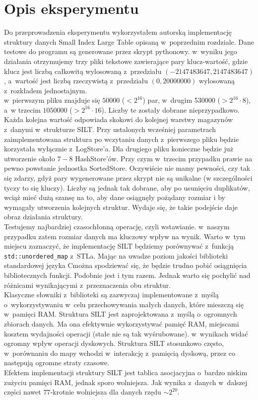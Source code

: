 \documentclass[declaration,shortabstract,masc]{iithesis}
\newcommand{\cpp}{C\raisebox{0.5ex}{{\tiny\textbf{++}}}}
\begin{document}
		\section{Opis eksperymentu}
			Do przeprowadzenia eksperymentu wykorzystałem autorską implementację\linebreak
			struktury danych Small Index Large Table opisaną w~poprzednim rozdziale. Dane testowe do programu są generowane przez skrypt pythonowy. w~wyniku jego działania otrzymujemy trzy pliki tekstowe zawierające pary klucz-wartość, gdzie klucz jest liczbą całkowitą wylosowaną z~przedziału $(-2147483647, 2147483647)$, a~wartość jest liczbą rzeczywistą z~przedziału $(0, 20000000)$ wylosowaną z~rozkładem jednostajnym.\\
			\indent w~pierwszym pliku znajduje się $50000$ ($< 2^{16}$) par, w~drugim 530000 ($> 2^{16}\cdot 8$), a~w trzecim $1050000$ ($> 2^{16}\cdot 16$). Liczby te zostały dobrane nieprzypadkowo. Każda kolejna wartość odpowiada skokowi do kolejnej warstwy magazynów z~danymi w~strukturze SILT. Przy ustalonych wcześniej parametrach zaimplementowana struktura po wczytaniu danych z~pierwszego pliku będzie korzystała wyłącznie z~LogStore'a. Dla drugiego pliku konieczne będzie już utworzenie około $7-8$ HashStore'ów. Przy czym w~trzecim przypadku prawie na pewno powstanie jednostka SortedStore. Oczywiście nie mamy pewności, czy tak się zdarzy, gdyż pary wygenerowane przez skrypt nie są unikalne (w szczególności tyczy to się kluczy). Liczby są jednak tak dobrane, aby po usunięciu duplikatów, wciąż mieć dużą szansę na to, aby dane osiągnęły pożądany rozmiar i by wymagały utworzenia kolejnych struktur. Wydaje się, że takie podejście daje obraz działania struktury.\\
			\indent Testujemy najbardziej czasochłonną operację, czyli wstawianie. w~naszym przypadku zatem rozmiar danych ma kluczowy wpływ na wynik. Warto w~tym miejscu zaznaczyć, że implementację SILT będziemy porównywać z~funkcją \linebreak
			\texttt{std::unordered\_map} z~STLa. Mając na uwadze poziom jakości biblioteki standardowej języka \cpp można spodziewać się, że będzie trudno pobić osiągnięcia bibliotecznych funkcji. Podobnie jest i tym razem. Jednak warto się pochylić nad różnicami wynikającymi z~przeznaczenia obu struktur.\\
			\indent Klasyczne słowniki z~biblioteki są zazwyczaj implementowane z~myślą o~wykorzystywaniu w~celu przechowywania małych danych, które mieszczą się w~pamięci RAM. Struktura SILT jest zaprojektowana z~myślą o~ogromnych zbiorach danych. Ma ona efektywnie wykorzystywać pamięć RAM, miejscami kosztem wydajności operacji (stałe nie są tak wyśrubowane). w~wynikach widać ogromny wpływ operacji dyskowych. Struktura SILT stosunkowo często, w~porównaniu do mapy wchodzi w~interakcję z~pamięcią dyskową, przez co następują ogromne straty czasowe.\\
			Efektem implementacji struktury SILT jest tablica asocjacyjna o~bardzo niskim zużyciu pamięci RAM, jednak sporo wolniejsza. Jak wynika z~danych w~dalszej części nawet $77$-krotnie wolniejsza dla danych rzędu $\sim2^{20}$.
\end{document}
